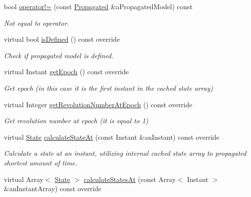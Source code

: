 \begin{DoxyCompactItemize}
bool \hyperlink{classostk_1_1astro_1_1trajectory_1_1orbit_1_1models_1_1_propagated_a71c17288a6039ddcc1a5d3e5e62e1f35}{operator!=} (const \hyperlink{classostk_1_1astro_1_1trajectory_1_1orbit_1_1models_1_1_propagated}{Propagated} \&a\+Propagated\+Model) const
\begin{DoxyCompactList}\small\item\em Not equal to operator. \end{DoxyCompactList}\item 
virtual bool \hyperlink{classostk_1_1astro_1_1trajectory_1_1orbit_1_1models_1_1_propagated_a530fd6bc017c74dedc43ced5fe843a03}{is\+Defined} () const override
\begin{DoxyCompactList}\small\item\em Check if propagated model is defined. \end{DoxyCompactList}\item 
virtual Instant \hyperlink{classostk_1_1astro_1_1trajectory_1_1orbit_1_1models_1_1_propagated_a3bf49ac0824e10057b6abca2cfcc692f}{get\+Epoch} () const override
\begin{DoxyCompactList}\small\item\em Get epoch (in this case it is the first instant in the cached state array) \end{DoxyCompactList}\item 
virtual Integer \hyperlink{classostk_1_1astro_1_1trajectory_1_1orbit_1_1models_1_1_propagated_a789e4236d2b8b212b1d978055b76abf1}{get\+Revolution\+Number\+At\+Epoch} () const override
\begin{DoxyCompactList}\small\item\em Get revolution number at epoch (it is equal to 1) \end{DoxyCompactList}\item 
virtual \hyperlink{classostk_1_1astro_1_1trajectory_1_1_state}{State} \hyperlink{classostk_1_1astro_1_1trajectory_1_1orbit_1_1models_1_1_propagated_a2efc3c1af735dcf2ec622d056fa0a13f}{calculate\+State\+At} (const Instant \&an\+Instant) const override
\begin{DoxyCompactList}\small\item\em Calculate a state at an instant, utilizing internal cached state array to propagated shortest amount of time. \end{DoxyCompactList}\item 
virtual Array$<$ \hyperlink{classostk_1_1astro_1_1trajectory_1_1_state}{State} $>$ \hyperlink{classostk_1_1astro_1_1trajectory_1_1orbit_1_1models_1_1_propagated_a9a4097432d2c863aedead23d2d67a7a7}{calculate\+States\+At} (const Array$<$ Instant $>$ \&an\+Instant\+Array) const override

\end{DoxyCompactItemize}
